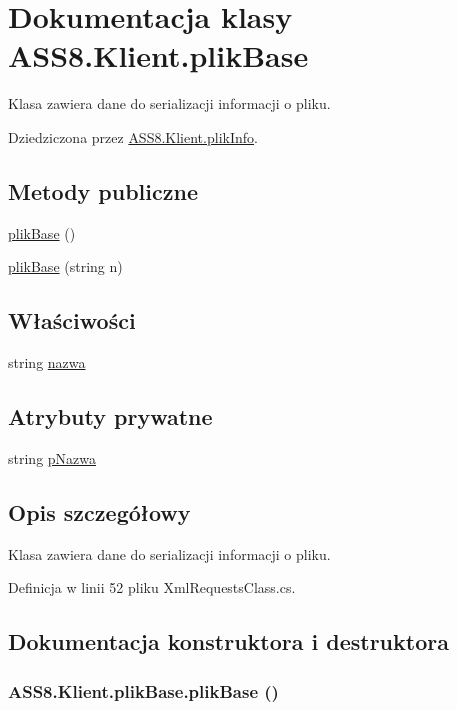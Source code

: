 \hypertarget{a00016}{
\section{Dokumentacja klasy ASS8.Klient.plikBase}
\label{d7/d7a/a00016}
}
Klasa zawiera dane do serializacji informacji o pliku.  


Dziedziczona przez \hyperlink{a00018}{ASS8.Klient.plikInfo}.

\subsection*{Metody publiczne}
\begin{CompactItemize}
\item 
\hyperlink{a00016_683a638604733cb067bbc347ce7d18d2}{plikBase} ()
\item 
\hyperlink{a00016_db9e4e56cb170266f06c629d133fbb35}{plikBase} (string n)
\end{CompactItemize}
\subsection*{Właściwości}
\begin{CompactItemize}
\item 
string \hyperlink{a00016_d79d58573126b1cd96f3c6966ae83434}{nazwa}
\end{CompactItemize}
\subsection*{Atrybuty prywatne}
\begin{CompactItemize}
\item 
string \hyperlink{a00016_806525aec3846557cca2c83f4f28bd22}{pNazwa}
\end{CompactItemize}


\subsection{Opis szczegółowy}
Klasa zawiera dane do serializacji informacji o pliku. 



Definicja w linii 52 pliku XmlRequestsClass.cs.

\subsection{Dokumentacja konstruktora i destruktora}
\hypertarget{a00016_683a638604733cb067bbc347ce7d18d2}{
\subsubsection[{plikBase}]{\setlength{\rightskip}{0pt plus 5cm}ASS8.Klient.plikBase.plikBase ()}}
\label{d7/d7a/a00016_683a638604733cb067bbc347ce7d18d2}





